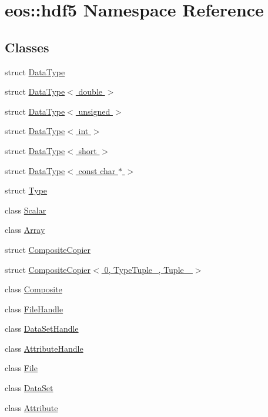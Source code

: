 \hypertarget{namespaceeos_1_1hdf5}{
\section{eos::hdf5 Namespace Reference}
\label{namespaceeos_1_1hdf5}
}
\subsection*{Classes}
\begin{DoxyCompactItemize}
\item 
struct \hyperlink{structeos_1_1hdf5_1_1DataType}{DataType}
\item 
struct \hyperlink{structeos_1_1hdf5_1_1DataType_3_01double_01_4}{DataType$<$ double $>$}
\item 
struct \hyperlink{structeos_1_1hdf5_1_1DataType_3_01unsigned_01_4}{DataType$<$ unsigned $>$}
\item 
struct \hyperlink{structeos_1_1hdf5_1_1DataType_3_01int_01_4}{DataType$<$ int $>$}
\item 
struct \hyperlink{structeos_1_1hdf5_1_1DataType_3_01short_01_4}{DataType$<$ short $>$}
\item 
struct \hyperlink{structeos_1_1hdf5_1_1DataType_3_01const_01char_01_5_01_4}{DataType$<$ const char $\ast$ $>$}
\item 
struct \hyperlink{structeos_1_1hdf5_1_1Type}{Type}
\item 
class \hyperlink{classeos_1_1hdf5_1_1Scalar}{Scalar}
\item 
class \hyperlink{classeos_1_1hdf5_1_1Array}{Array}
\item 
struct \hyperlink{structeos_1_1hdf5_1_1CompositeCopier}{CompositeCopier}
\item 
struct \hyperlink{structeos_1_1hdf5_1_1CompositeCopier_3_010_00_01TypeTuple___00_01Tuple___01_4}{CompositeCopier$<$ 0, TypeTuple\_\-, Tuple\_\- $>$}
\item 
class \hyperlink{classeos_1_1hdf5_1_1Composite}{Composite}
\item 
class \hyperlink{classeos_1_1hdf5_1_1FileHandle}{FileHandle}
\item 
class \hyperlink{classeos_1_1hdf5_1_1DataSetHandle}{DataSetHandle}
\item 
class \hyperlink{classeos_1_1hdf5_1_1AttributeHandle}{AttributeHandle}
\item 
class \hyperlink{classeos_1_1hdf5_1_1File}{File}
\item 
class \hyperlink{classeos_1_1hdf5_1_1DataSet}{DataSet}
\item 
class \hyperlink{classeos_1_1hdf5_1_1Attribute}{Attribute}
\end{DoxyCompactItemize}

